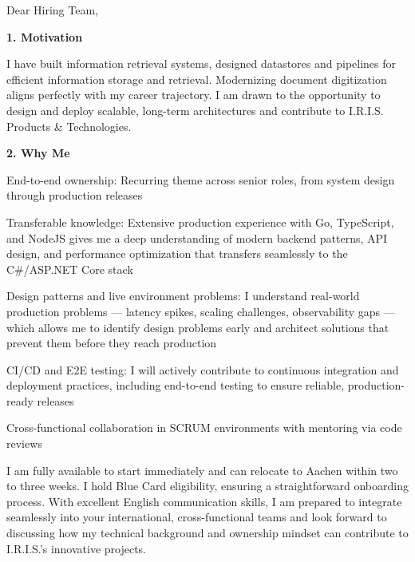 \documentclass[11pt,a4paper]{coverletter}
\begin{document}

\opening{Dear Hiring Team,}

\vspace{8pt}\noindent\textbf{1. Motivation}\par\vspace{3pt}

I have built information retrieval systems, designed datastores and pipelines for efficient information storage and retrieval. Modernizing document digitization aligns perfectly with my career trajectory. I am drawn to the opportunity to design and deploy scalable, long-term architectures and contribute to I.R.I.S. Products \& Technologies.

\vspace{8pt}\noindent\textbf{2. Why Me}\par\vspace{3pt}

\bullets

  \item End-to-end ownership: Recurring theme across senior roles, from system design through production releases

  \item Transferable knowledge: Extensive production experience with Go, TypeScript, and NodeJS gives me a deep understanding of modern backend patterns, API design, and performance optimization that transfers seamlessly to the C\#/ASP.NET Core stack

  \item Design patterns and live environment problems: I understand real-world production problems — latency spikes, scaling challenges, observability gaps — which allows me to identify design problems early and architect solutions that prevent them before they reach production

  \item CI/CD and E2E testing: I will actively contribute to continuous integration and deployment practices, including end-to-end testing to ensure reliable, production-ready releases

  \item Cross-functional collaboration in SCRUM environments with mentoring via code reviews

\bulletsend

I am fully available to start immediately and can relocate to Aachen within two to three weeks. I hold Blue Card eligibility, ensuring a straightforward onboarding process. With excellent English communication skills, I am prepared to integrate seamlessly into your international, cross-functional teams and look forward to discussing how my technical background and ownership mindset can contribute to I.R.I.S.’s innovative projects.
\end{document}
